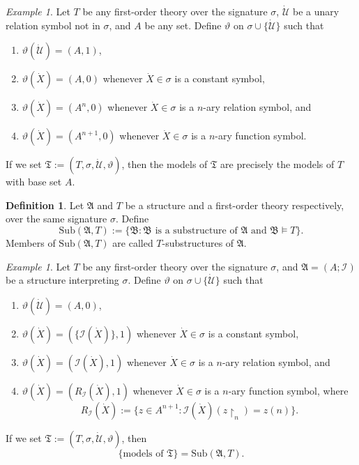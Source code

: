 \documentclass[12pt, twoside]{memoir}
\numberwithin{equation}{section}
\theoremstyle{definition}
\newtheorem{defi}[thm]{Definition}
\theoremstyle{remark}
\newtheorem{ex}[thm]{Example}
\theoremstyle{definition}
\theoremstyle{definition}
\theoremstyle{definition}
\theoremstyle{remark}
\begin{document}
\begin{ex}
Let $T$ be any first-order theory over the signature $\sigma$, $\dot{\mathcal{U}}$ be a unary relation symbol not in $\sigma$, and $A$ be any set. Define $\vartheta$ on $\sigma \cup \{\dot{\mathcal{U}}\}$ such that
\begin{enumerate}[label=(\alph*)]
    \item $\vartheta(\dot{\mathcal{U}}) = (A, 1)$,
    \item $\vartheta(\dot{X}) = (A, 0)$ whenever $\dot{X} \in \sigma$ is a constant symbol,
    \item $\vartheta(\dot{X}) = (A^n, 0)$ whenever $\dot{X} \in \sigma$ is a $n$-ary relation symbol, and
    \item  $\vartheta(\dot{X}) = (A^{n+1}, 0)$ whenever $\dot{X} \in \sigma$ is a $n$-ary function symbol.
\end{enumerate}
If we set $\mathfrak{T} := (T, \sigma, \dot{\mathcal{U}}, \vartheta)$, then the models of $\mathfrak{T}$ are precisely the models of $T$ with base set $A$.
\end{ex}

\begin{defi}
Let $\mathfrak{A}$ and $T$ be a structure and a first-order theory respectively, over the same signature $\sigma$. Define $$\mathrm{Sub}(\mathfrak{A}, T) := \{\mathfrak{B} : \mathfrak{B} \text{ is a substructure of } \mathfrak{A} \text{ and } \mathfrak{B} \models T\}.$$ Members of $\mathrm{Sub}(\mathfrak{A}, T)$ are called $T$-substructures of $\mathfrak{A}$.
\end{defi}

\begin{ex}\label{2ndex}
Let $T$ be any first-order theory over the signature $\sigma$, and $\mathfrak{A} = (A; \mathcal{I})$ be a structure interpreting $\sigma$. Define $\vartheta$ on $\sigma \cup \{\dot{\mathcal{U}}\}$ such that
\begin{enumerate}[label=(\alph*)]
    \item $\vartheta(\dot{\mathcal{U}}) = (A, 0)$,
    \item $\vartheta(\dot{X}) = (\{\mathcal{I}(\dot{X})\}, 1)$ whenever $\dot{X} \in \sigma$ is a constant symbol,
    \item $\vartheta(\dot{X}) = (\mathcal{I}(\dot{X}), 1)$ whenever $\dot{X} \in \sigma$ is a $n$-ary relation symbol, and
    \item  $\vartheta(\dot{X}) = (R_{\mathcal{I}}(\dot{X}), 1)$ whenever $\dot{X} \in \sigma$ is a $n$-ary function symbol, where $$R_{\mathcal{I}}(\dot{X}) := \{z \in A^{n+1} : \mathcal{I}(\dot{X})(z \! \restriction_n) = z(n)\}.$$
\end{enumerate}
If we set $\mathfrak{T} := (T, \sigma, \dot{\mathcal{U}}, \vartheta)$, then $$\{ \text{models of } \mathfrak{T}\} = \mathrm{Sub}(\mathfrak{A}, T).$$
\end{ex}
\end{document}
